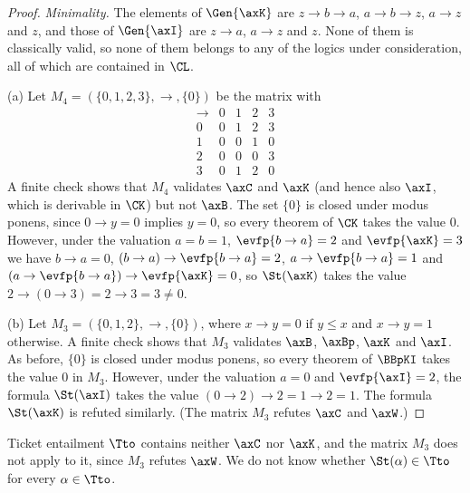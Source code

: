 \begin{proof}
\emph{Minimality.} The elements of $\Gen{\axK}$ are $z\to b\to a$,
$a\to b\to z$, $a\to z$ and $z$, and those of $\Gen{\axI}$ are $z\to a$, $a\to z$
and $z$. None of them is classically valid, so none of them belongs to any
of the logics under consideration, all of which are contained in $\CL$.

(a) Let $M_4=(\{0,1,2,3\},\to,\{0\})$ be the matrix with
\[
\begin{array}{c|cccc}
\to&0&1&2&3\\\hline
0&0&1&2&3\\
1&0&0&1&0\\
2&0&0&0&3\\
3&0&1&2&0
\end{array}
\]
A finite check shows that $M_4$ validates $\axC$ and $\axK$ (and hence also $\axI$,
which is derivable in $\CK$) but not $\axB$. The set $\{0\}$ is closed
under modus ponens, since $0\to y=0$ implies $y=0$, so every theorem of
$\CK$ takes the value $0$. However, under the valuation $a=b=1$,
$\evfp{b\to a}=2$ and $\evfp{\axK}=3$ we have $b\to a=0$, $(b\to a)\to \evfp{b\to a}=2$,
$a\to \evfp{b\to a}=1$ and $(a\to \evfp{b\to a})\to \evfp{\axK}=0$, so $\St(\axK)$ takes the value
$2\to(0\to3)=2\to3=3\ne0$.

(b) Let $M_3=(\{0,1,2\},\to,\{0\})$, where $x\to y=0$ if $y\le x$ and
$x\to y=1$ otherwise. A finite check shows that $M_3$ validates $\axB$, $\axBp$,
$\axK$ and $\axI$. As before, $\{0\}$ is closed under modus ponens, so every
theorem of $\BBpKI$ takes the value $0$ in $M_3$. However, under the
valuation $a=0$ and $\evfp{\axI}=2$, the formula $\St(\axI)$ takes the value
$(0\to2)\to2=1\to2=1$. The formula $\St(\axK)$ is refuted similarly. (The
matrix $M_3$ refutes $\axC$ and $\axW$.)
\end{proof}

Ticket entailment $\Tto$ contains neither $\axC$ nor $\axK$, and the
matrix $M_3$ does not apply to it, since $M_3$ refutes $\axW$. We do not
know whether $\St(\alpha)\in\Tto$ for every $\alpha\in\Tto$.

